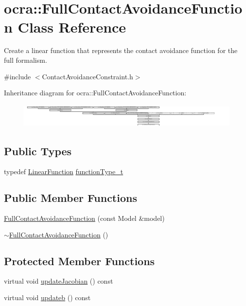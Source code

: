 \hypertarget{classocra_1_1FullContactAvoidanceFunction}{}\section{ocra\+:\+:Full\+Contact\+Avoidance\+Function Class Reference}
\label{classocra_1_1FullContactAvoidanceFunction}


Create a linear function that represents the contact avoidance function for the full formalism.  




{\ttfamily \#include $<$Contact\+Avoidance\+Constraint.\+h$>$}

Inheritance diagram for ocra\+:\+:Full\+Contact\+Avoidance\+Function\+:\begin{figure}[H]
\begin{center}
\leavevmode
\includegraphics[height=1.262480cm]{da/d90/classocra_1_1FullContactAvoidanceFunction}
\end{center}
\end{figure}
\subsection*{Public Types}
\begin{DoxyCompactItemize}
\item 
typedef \hyperlink{classocra_1_1LinearFunction}{Linear\+Function} \hyperlink{classocra_1_1FullContactAvoidanceFunction_a9b59cb139be82095188084893d70b996}{function\+Type\+\_\+t}
\end{DoxyCompactItemize}
\subsection*{Public Member Functions}
\begin{DoxyCompactItemize}
\item 
\hyperlink{classocra_1_1FullContactAvoidanceFunction_aa1632bec7158003ab2da17f71aa134e0}{Full\+Contact\+Avoidance\+Function} (const Model \&model)
\item 
\hyperlink{classocra_1_1FullContactAvoidanceFunction_abf414a050f3b16c4a095049937335c96}{$\sim$\+Full\+Contact\+Avoidance\+Function} ()
\end{DoxyCompactItemize}
\subsection*{Protected Member Functions}
\begin{DoxyCompactItemize}
\item 
virtual void \hyperlink{classocra_1_1FullContactAvoidanceFunction_a91b21004faed7ffa6a51e975abc93797}{update\+Jacobian} () const
\item 
virtual void \hyperlink{classocra_1_1FullContactAvoidanceFunction_ae24690ecd464eefd43936907e33c4cb9}{updateb} () const
\end{DoxyCompactItemize}
